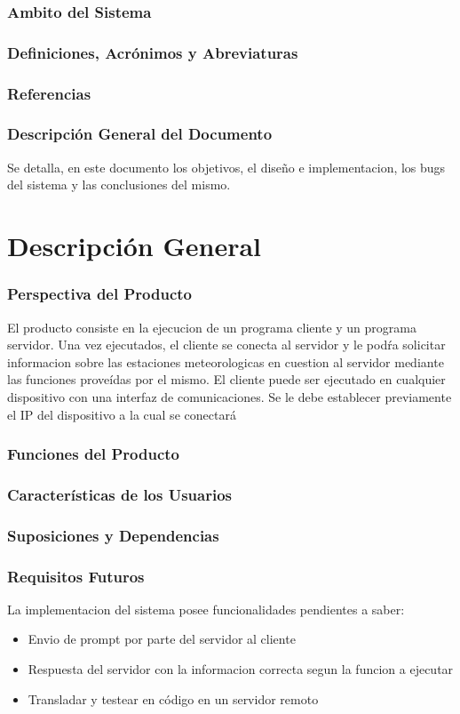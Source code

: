\documentclass[10pt, a4paper,notitlepage]{article}
\begin{document}
\subsubsection{Ambito del Sistema}
\subsubsection{Definiciones, Acrónimos y Abreviaturas} 
\subsubsection{Referencias}

\subsubsection{Descripción General del Documento}
Se detalla, en este documento los objetivos, el diseño e implementacion, los bugs del sistema y las conclusiones del mismo.
\section{Descripción General}
\subsubsection{Perspectiva del Producto }
El producto consiste en la ejecucion de un programa cliente y un programa servidor.
Una vez ejecutados, el cliente se conecta al servidor y le podŕa solicitar informacion sobre las estaciones meteorologicas en cuestion al servidor mediante las funciones proveídas por el mismo.
El cliente puede ser ejecutado en cualquier dispositivo con una interfaz de comunicaciones. Se le debe establecer previamente el IP del dispositivo a la cual se conectará
\subsubsection{Funciones del Producto}
\subsubsection{Características de los Usuarios }

\subsubsection{Suposiciones y Dependencias}

\subsubsection{Requisitos Futuros}
La implementacion del sistema posee funcionalidades pendientes a saber:
\begin{itemize}
	\item Envio de prompt por parte del servidor al cliente 
	\item Respuesta del servidor con la informacion correcta segun la funcion a ejecutar
	\item Transladar y testear en código en un servidor remoto 
	
\end{itemize}
\end{document}
